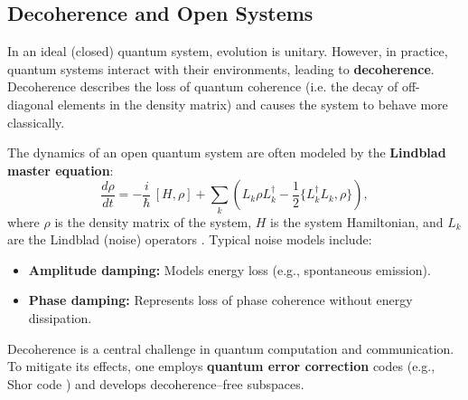 
\subsection{Decoherence and Open Systems}
\label{subsec:decoherence}

In an ideal (closed) quantum system, evolution is unitary. However, in practice, quantum systems interact with their environments, leading to \textbf{decoherence}. Decoherence describes the loss of quantum coherence (i.e. the decay of off-diagonal elements in the density matrix) and causes the system to behave more classically.

The dynamics of an open quantum system are often modeled by the \textbf{Lindblad master equation}:
\[
\frac{d\rho}{dt} = -\frac{i}{\hbar}\,[H, \rho] + \sum_k \left( L_k \rho L_k^\dagger - \frac{1}{2}\{L_k^\dagger L_k, \rho\} \right),
\]
where \(\rho\) is the density matrix of the system, \(H\) is the system Hamiltonian, and \(L_k\) are the Lindblad (noise) operators \cite{breuer2002theory}. Typical noise models include:
\begin{itemize}
    \item \textbf{Amplitude damping:} Models energy loss (e.g., spontaneous emission).
    \item \textbf{Phase damping:} Represents loss of phase coherence without energy dissipation.
\end{itemize}

Decoherence is a central challenge in quantum computation and communication. To mitigate its effects, one employs \textbf{quantum error correction} codes (e.g., Shor code \cite{shor1995scheme}) and develops decoherence–free subspaces.
